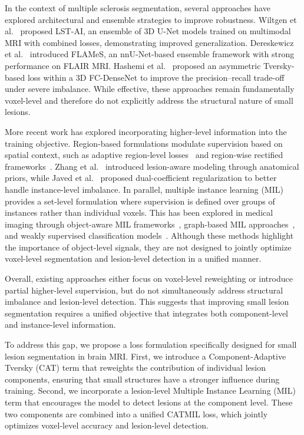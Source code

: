 In the context of multiple sclerosis segmentation, several approaches
have explored architectural and ensemble strategies to improve
robustness. Wiltgen et al.~\cite{wiltgen_lst-ai_2024} proposed LST-AI,
an ensemble of 3D U-Net models trained on multimodal MRI with combined
losses, demonstrating improved generalization. Dereskewicz et
al.~\cite{dereskewicz_flames_2025} introduced FLAMeS, an nnU-Net-based
ensemble framework with strong performance on FLAIR MRI. Hashemi et
al.~\cite{hashemi_asymmetric_2019} proposed an asymmetric Tversky-based
loss within a 3D FC-DenseNet to improve the precision--recall trade-off
under severe imbalance. While effective, these approaches remain
fundamentally voxel-level and therefore do not explicitly address the
structural nature of small lesions.

More recent work has explored incorporating higher-level information into
the training objective. Region-based formulations modulate supervision
based on spatial context, such as adaptive region-level
losses~\cite{chen_adaptive_2023} and region-wise rectified
frameworks~\cite{valverde_region-wise_2023}. Zhang et
al.~\cite{zhang_all-net_2021} introduced lesion-aware modeling through
anatomical priors, while Javed et al.~\cite{aqib_javed_novel_2025}
proposed dual-coefficient regularization to better handle instance-level
imbalance. In parallel, multiple instance learning (MIL) provides a
set-level formulation where supervision is defined over groups of
instances rather than individual voxels. This has been explored in
medical imaging through object-aware MIL frameworks~\cite{liu_object_2026},
graph-based MIL approaches~\cite{huang_geometric_2026}, and weakly
supervised classification models~\cite{pal_deep_2021}. Although these
methods highlight the importance of object-level signals, they are not
designed to jointly optimize voxel-level segmentation and lesion-level
detection in a unified manner.

Overall, existing approaches either focus on voxel-level reweighting or
introduce partial higher-level supervision, but do not simultaneously
address structural imbalance and lesion-level detection. This suggests
that improving small lesion segmentation requires a unified objective
that integrates both component-level and instance-level information.

To address this gap, we propose a loss formulation specifically designed
for small lesion segmentation in brain MRI. First, we introduce a
Component-Adaptive Tversky (CAT) term that reweights the contribution of
individual lesion components, ensuring that small structures have a
stronger influence during training. Second, we incorporate a lesion-level
Multiple Instance Learning (MIL) term that encourages the model to detect
lesions at the component level. These two components are combined into a
unified CATMIL loss, which jointly optimizes voxel-level accuracy and
lesion-level detection.

